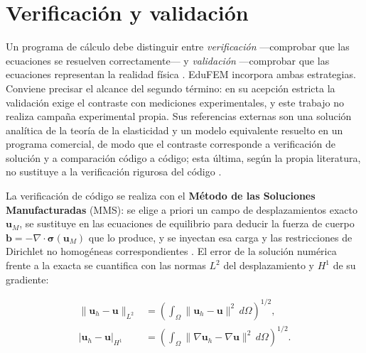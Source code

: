 \section{Verificación y validación}
\label{sec:verificacion-validacion}

Un programa de cálculo debe distinguir entre \emph{verificación} —comprobar que las ecuaciones se resuelven correctamente— y \emph{validación} —comprobar que las ecuaciones representan la realidad física \autocite[pp.~13-14]{oberkampf2010vv}. EduFEM incorpora ambas estrategias. Conviene precisar el alcance del segundo término: en su acepción estricta la validación exige el contraste con mediciones experimentales, y este trabajo no realiza campaña experimental propia. Sus referencias externas son una solución analítica de la teoría de la elasticidad y un modelo equivalente resuelto en un programa comercial, de modo que el contraste corresponde a verificación de solución y a comparación código a código; esta última, según la propia literatura, no sustituye a la verificación rigurosa del código \autocite{oberkampf2010vv}.

La verificación de código se realiza con el \textbf{Método de las Soluciones Manufacturadas} (MMS): se elige a priori un campo de desplazamientos exacto $\bm{u}_M$, se sustituye en las ecuaciones de equilibrio para deducir la fuerza de cuerpo $\bm{b} = -\nabla\cdot\bm{\sigma}(\bm{u}_M)$ que lo produce, y se inyectan esa carga y las restricciones de Dirichlet no homogéneas correspondientes \autocites[pp.~21 y 26]{salari2000mms}[pp.~219-222]{oberkampf2010vv}. El error de la solución numérica frente a la exacta se cuantifica con las normas $L^2$ del desplazamiento y $H^1$ de su gradiente:

\begin{equation}
\begin{aligned}
\|\bm{u}_h - \bm{u}\|_{L^2} &= \left( \int_\Omega \|\bm{u}_h - \bm{u}\|^2 \, d\Omega \right)^{1/2}, \\
|\bm{u}_h - \bm{u}|_{H^1} &= \left( \int_\Omega \|\nabla\bm{u}_h - \nabla\bm{u}\|^2 \, d\Omega \right)^{1/2}.
\end{aligned}
\label{eq:normas-error}
\end{equation}

